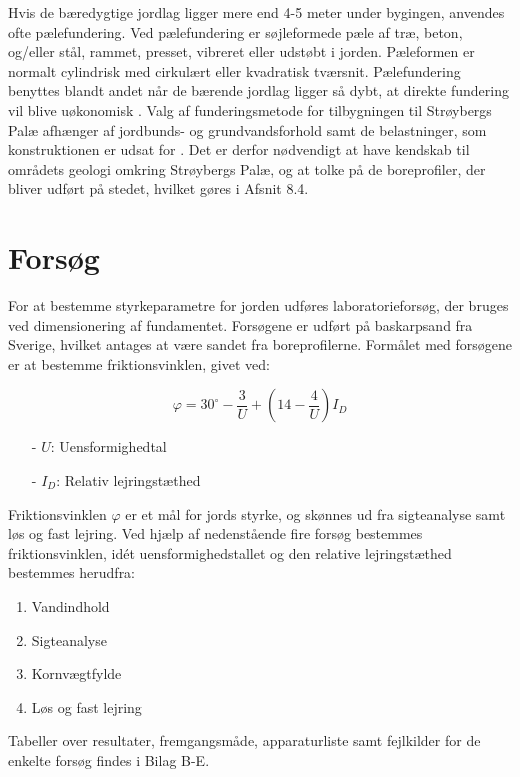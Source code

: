 \indent{     }  Hvis de bæredygtige jordlag ligger mere end 4-5 meter under bygingen, anvendes ofte pælefundering. Ved pælefundering er søjleformede pæle af træ, beton, og/eller stål, rammet, presset, vibreret eller udstøbt i jorden. Pæleformen er normalt cylindrisk med cirkulært eller kvadratisk tværsnit. Pælefundering benyttes blandt andet når de bærende jordlag ligger så dybt, at direkte fundering vil blive uøkonomisk \citep[ s. 355]{geoteknik}.
\newline
\newline
Valg af funderingsmetode for tilbygningen til Strøybergs Palæ afhænger af jordbunds- og grundvandsforhold samt de belastninger, som konstruktionen er udsat for \citep[ s. 355]{geoteknik}. Det er derfor nødvendigt at have kendskab til områdets geologi omkring Strøybergs Palæ, og at tolke på de boreprofiler, der bliver udført på stedet, hvilket gøres i Afsnit 8.4. 

\section{Forsøg}
For at bestemme styrkeparametre for jorden udføres laboratorieforsøg, der bruges ved dimensionering af fundamentet. Forsøgene er udført på baskarpsand fra Sverige, hvilket antages at være sandet fra boreprofilerne.
\newline
\newline
Formålet med forsøgene er at bestemme friktionsvinklen, givet ved: 

\begin{equation}
	\varphi = 30^\circ - \frac{3}{U} + (14 - \frac{4}{U}) I_D
\end{equation}

\begin{itemize}
	\item[-] $U$: Uensformighedtal
	\item[-] $I_D$: Relativ lejringstæthed
\end{itemize}

Friktionsvinklen $\varphi$ er et mål for jords styrke, og skønnes ud fra sigteanalyse samt løs og fast lejring. Ved hjælp af nedenstående fire forsøg bestemmes friktionsvinklen, idét uensformighedstallet og den relative lejringstæthed bestemmes herudfra: 
\begin{enumerate}
	\item Vandindhold
	\item Sigteanalyse
	\item Kornvægtfylde
	\item Løs og fast lejring
\end{enumerate}
Tabeller over resultater, fremgangsmåde, apparaturliste samt fejlkilder for de enkelte forsøg findes i Bilag B-E.

